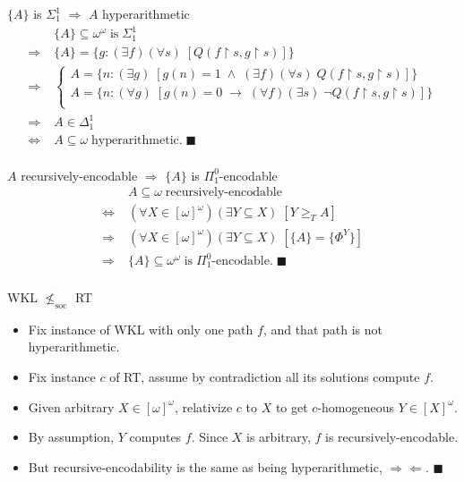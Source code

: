 \begin{frame}{$\{A\}$ is $\Sigma_1^1$ $\Rightarrow$ $A$ hyperarithmetic}
  \begin{align*}
    &\{A\}\subseteq\omega^\omega\; \text{is}\; \Sigma_1^1\\
    \Rightarrow\; & \{A\}= \{g:(\exists f)(\forall s)\; [Q(f\restriction
      s,g\restriction s)]\}\\
    \Rightarrow\; &
      \begin{cases}
        A=\{n:(\exists g)\; [g(n)=1\; \wedge\; (\exists f)(\forall s)\;
          Q(f\restriction s,g\restriction s)]\}\\
        A=\{n:(\forall g)\; [g(n)=0\; \rightarrow\; (\forall f)(\exists s)\;
          \neg Q(f\restriction s,g\restriction s)]\}\\
      \end{cases}\\
    \Rightarrow\; &A\in\Delta_1^1\\
    \Leftrightarrow\; &A\subseteq\omega\; \text{hyperarithmetic}.\;
    \blacksquare\\
  \end{align*}
\end{frame}

\begin{frame}{$A$ recursively-encodable $\Rightarrow$
$\{A\}$ is $\Pi_1^0$-encodable}
  \begin{align*}
    \;&A\subseteq\omega\; \text{recursively-encodable}\\
    \Leftrightarrow\; & (\forall X\in[\omega]^\omega)(\exists Y\subseteq
      X)\; [Y\geq_T A]\\
    \Rightarrow\; & (\forall X\in[\omega]^\omega)(\exists Y\subseteq X)\;
      [\{A\}=\{\Phi^Y\}]\\
    \Rightarrow\; &\{A\}\subseteq\omega^\omega\; \text{is}\;
      \Pi_1^0\text{-encodable}.\; \blacksquare\\
  \end{align*}
\end{frame}

\begin{frame}{WKL $\nleq_{\text{soc}}$ RT}
  \begin{itemize}
    \item Fix instance of WKL with only one path $f$, and that path is
      not hyperarithmetic.
    \item Fix instance $c$ of RT, assume by contradiction all
      its solutions compute $f$.
    \item Given arbitrary $X\in[\omega]^\omega$, relativize $c$ to
      $X$ to get $c$-homogeneous $Y\in[X]^\omega$.
    \item By assumption, $Y$ computes $f$. Since $X$ is arbitrary, $f$ is
      recursively-encodable.
    \item But recursive-encodability is the same as being
      hyperarithmetic, $\Rightarrow\Leftarrow$. $\blacksquare$
  \end{itemize}
\end{frame}

